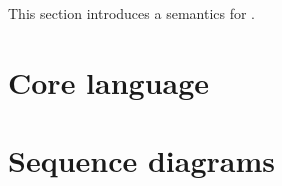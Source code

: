 
This section introduces a \tockcsp{} semantics for \langname.

\section{Core language}\label{sec:semantics-tockcsp-core}

\section{Sequence diagrams}\label{sec:semantics-tockcsp-seq}


